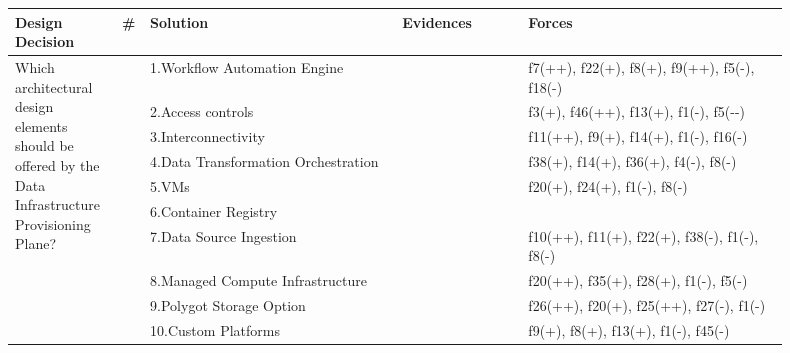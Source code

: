 \begin{tabular}{|p{0.12\linewidth}|p{0.015\linewidth}|p{0.3\linewidth}|p{0.15\linewidth}|p{0.31\linewidth}|}
\hline
{\bf Design Decision} & {\bf \#} & {\bf Solution} & {\bf Evidences} & {\bf Forces}\\
\hline
\multirow{10}{\linewidth}{Which architectural design elements should be offered by the Data Infrastructure Provisioning Plane?} &\cellcolor{emerald_shape_7}{} &1.Workflow Automation Engine&\cellcolor{emerald_shape_3}{s19, s21, s26, s32, s40, p2, p5} & f7(++), f22(+), f8(+), f9(++), f5(-), f18(-)\\
 & \cellcolor{emerald_shape_7}{} & 2.Access controls&\cellcolor{emerald_shape_5}{s2, s3, s5, s8, s9, s11, s13, s15, s16, s17, s26, s27, s28, s29, s31, s32, s33, s35, s42, s43} & f3(+), f46(++), f13(+), f1(-), f5(-{}-)\\
 & \cellcolor{emerald_shape_7}{} & 3.Interconnectivity&\cellcolor{emerald_shape_3}{s1, s11, s14, s17, s31, s33, p6} & f11(++), f9(+), f14(+), f1(-), f16(-)\\
 & \cellcolor{emerald_shape_7}{} & 4.Data Transformation Orchestration&\cellcolor{emerald_shape_6}{s5, s6, s11, s12, s13, s16, s17, s18, s26, s27, s28, s30, s31, s33, s35, s37, s38, s40, s41, s42, s43, p1, p5} & f38(+), f14(+), f36(+), f4(-), f8(-)\\
 & \cellcolor{emerald_shape_7}{} & 5.VMs&\cellcolor{emerald_shape_2}{s26, s30, s33, p4} & f20(+), f24(+), f1(-), f8(-)\\
 & \cellcolor{emerald_shape_7}{} & 6.Container Registry&\cellcolor{emerald_shape_3}{s10, s26, s29, s30, p2, p5} & \\
 & \cellcolor{emerald_shape_7}{} & 7.Data Source Ingestion&\cellcolor{emerald_shape_5}{s3, s4, s12, s13, s14, s18, s20, s22, s25, s27, s28, s30, s31, s33, s34, s40, s41} & f10(++), f11(+), f22(+), f38(-), f1(-), f8(-)\\
 & \cellcolor{emerald_shape_7}{} & 8.Managed Compute Infrastructure&\cellcolor{emerald_shape_4}{s3, s4, s5, s11, s12, s13, s16, s27, s30, s32, s33, s34, s35} & f20(++), f35(+), f28(+), f1(-), f5(-)\\
 & \cellcolor{emerald_shape_7}{} & 9.Polygot Storage Option&\cellcolor{emerald_shape_5}{s1, s3, s5, s6, s7, s11, s13, s15, s16, s18, s26, s27, s29, s30, s31, s33, s34, s35, s40, s41, s43, p3} & f26(++), f20(+), f25(++), f27(-), f1(-)\\
 & \multirow{-10}{\linewidth}{ \cellcolor{emerald_shape_7}{45}} &10.Custom Platforms&\cellcolor{emerald_shape_3}{s1, s8, s10, s12, s15, s40, s41} & f9(+), f8(+), f13(+), f1(-), f45(-)\\

\end{tabular}
